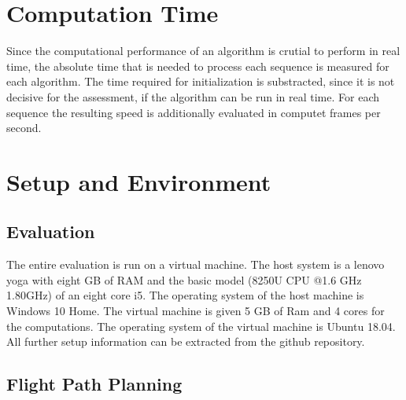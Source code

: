 \section{Computation Time}
	
	Since the computational performance of an algorithm is crutial to perform in real time, the absolute time that is needed to process each 
	sequence is measured for each algorithm. The time required for initialization is substracted, since it is not decisive for the assessment, 
	if the algorithm can be run in real time. For each sequence the resulting speed is additionally evaluated in computet frames per second. 
	
\section{Setup and Environment}

	\subsection{Evaluation}
	
	The entire evaluation is run on a virtual machine. The host system is a lenovo yoga with eight GB of RAM and the basic model (8250U CPU @1.6 
	GHz 1.80GHz) of an eight core i5. The operating system of the host machine is Windows 10 Home. The virtual
	machine is given 5 GB of Ram and 4 cores for the computations. The operating system of the virtual machine is Ubuntu 18.04. All further setup information can be extracted 
	from the github repository.

	\subsection{Flight Path Planning}